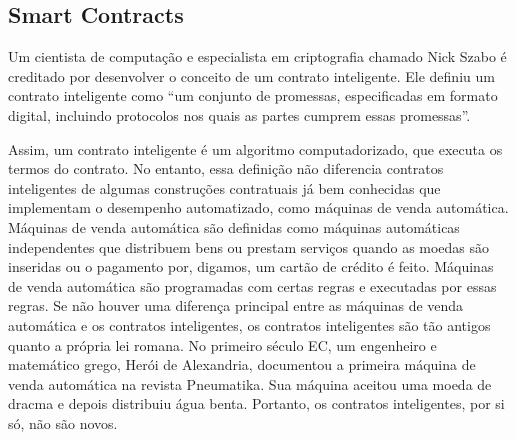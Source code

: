     
    \subsection{Smart Contracts}
        
        Um cientista de computação e especialista em criptografia chamado Nick Szabo é creditado por desenvolver o conceito de um contrato inteligente. Ele definiu um contrato inteligente como ``um conjunto de promessas, especificadas em formato digital, incluindo protocolos nos quais as partes cumprem essas promessas''. \cite{smart_contracts_szabo}

        Assim, um contrato inteligente é um algoritmo computadorizado, que executa os termos do contrato. No entanto, essa definição não diferencia contratos inteligentes de algumas construções contratuais já bem conhecidas que implementam o desempenho automatizado, como máquinas de venda automática. Máquinas de venda automática são definidas como máquinas automáticas independentes que distribuem bens ou prestam serviços quando as moedas são inseridas ou o pagamento por, digamos, um cartão de crédito é feito. Máquinas de venda automática são programadas com certas regras e executadas por essas regras. Se não houver uma diferença principal entre as máquinas de venda automática e os contratos inteligentes, os contratos inteligentes são tão antigos quanto a própria lei romana. No primeiro século EC, um engenheiro e matemático grego, Herói de Alexandria, documentou a primeira máquina de venda automática na revista Pneumatika. Sua máquina aceitou uma moeda de dracma e depois distribuiu água benta. Portanto, os contratos inteligentes, por si só, não são novos.\cite{blockchain_pratical_guide}
        

        \cite{bitcoin_and_blockchainsecurity}

